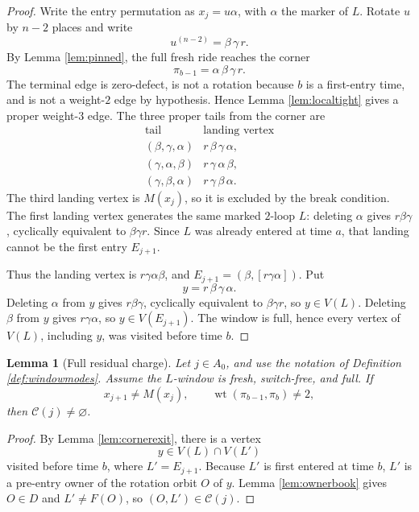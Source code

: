 \documentclass[11pt]{article}
\newtheorem{lemma}[theorem]{Lemma}
\DeclareMathOperator{\wt}{wt}
\begin{document}
\begin{proof}
Write the entry permutation as \(x_j=u\alpha\), with \(\alpha\) the marker of \(L\).  Rotate
\(u\) by \(n-2\) places and write
\[
  u^{(n-2)}=\beta\,\gamma\,r.
\]
By Lemma \ref{lem:pinned}, the full fresh ride reaches the corner
\[
  \pi_{b-1}=\alpha\,\beta\,\gamma\,r .
\]
The terminal edge is zero-defect, is not a rotation because \(b\) is a first-entry time, and is
not a weight-\(2\) edge by hypothesis.  Hence Lemma \ref{lem:localtight} gives a proper
weight-\(3\) edge.  The three proper tails from the corner are
\[
\begin{array}{c|c}
\text{tail} & \text{landing vertex}\\ \hline
(\beta,\gamma,\alpha) & r\,\beta\,\gamma\,\alpha,\\
(\gamma,\alpha,\beta) & r\,\gamma\,\alpha\,\beta,\\
(\gamma,\beta,\alpha) & r\,\gamma\,\beta\,\alpha .
\end{array}
\]
The third landing vertex is \(M(x_j)\), so it is excluded by the break condition.  The first
landing vertex generates the same marked \(2\)-loop \(L\): deleting \(\alpha\) gives
\(r\beta\gamma\), cyclically equivalent to \(\beta\gamma r\).  Since \(L\) was already entered at
time \(a\), that landing cannot be the first entry \(E_{j+1}\).

Thus the landing vertex is \(r\gamma\alpha\beta\), and \(E_{j+1}=(\beta,[r\gamma\alpha])\).  Put
\[
  y=r\,\beta\,\gamma\,\alpha .
\]
Deleting \(\alpha\) from \(y\) gives \(r\beta\gamma\), cyclically equivalent to
\(\beta\gamma r\), so \(y\in V(L)\).  Deleting \(\beta\) from \(y\) gives \(r\gamma\alpha\), so
\(y\in V(E_{j+1})\).  The window is full, hence every vertex of \(V(L)\), including \(y\), was
visited before time \(b\).
\end{proof}

\begin{lemma}[Full residual charge]\label{lem:fullresidual}
Let \(j\in A_0\), and use the notation of Definition \ref{def:windowmodes}.  Assume the
\(L\)-window is fresh, switch-free, and full.  If
\[
  x_{j+1}\ne M(x_j),\qquad \wt(\pi_{b-1},\pi_b)\ne2,
\]
then \(\mathcal C(j)\ne\varnothing\).
\end{lemma}

\begin{proof}
By Lemma \ref{lem:cornerexit}, there is a vertex
\[
  y\in V(L)\cap V(L')
\]
visited before time \(b\), where \(L'=E_{j+1}\).
Because \(L'\) is first entered at time \(b\), \(L'\) is a pre-entry owner of the rotation orbit
\(O\) of \(y\).  Lemma \ref{lem:ownerbook} gives \(O\in D\) and \(L'\ne F(O)\), so
\((O,L')\in\mathcal C(j)\).
\end{proof}
\end{document}
